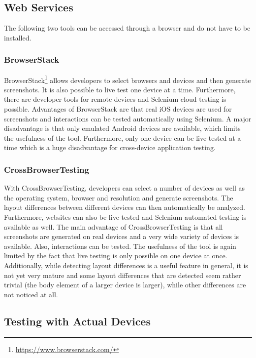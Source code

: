 \subsection{Web Services}

The following two tools can be accessed through a browser and do not have to be installed.

\subsubsection{BrowserStack}

BrowserStack\footnote{\url{https://www.browserstack.com/}} allows developers to select browsers and devices and then generate screenshots. It is also possible to live test one device at a time. Furthermore, there are developer tools for remote devices and Selenium cloud testing is possible. Advantages of BrowserStack are that real iOS devices are used for screenshots and interactions can be tested automatically using Selenium. A major disadvantage is that only emulated Android devices are available, which limits the usefulness of the tool. Furthermore, only one device can be live tested at a time which is a huge disadvantage for cross-device application testing. 

\subsubsection{CrossBrowserTesting}

With CrossBrowserTesting, developers can select a number of devices as well as the operating system, browser and resolution and generate screenshots. The layout differences between different devices can then automatically be analyzed. Furthermore, websites can also be live tested and Selenium automated testing is available as well. The main advantage of CrossBrowserTesting is that all screenshots are generated on real devices and a very wide variety of devices is available. Also, interactions can be tested. The usefulness of the tool is again limited by the fact that live testing is only possible on one device at once. Additionally, while detecting layout differences is a useful feature in general, it is not yet very mature and some layout differences that are detected seem rather trivial (the body element of a larger device is larger), while other differences are not noticed at all.

\subsection{Testing with Actual Devices}

